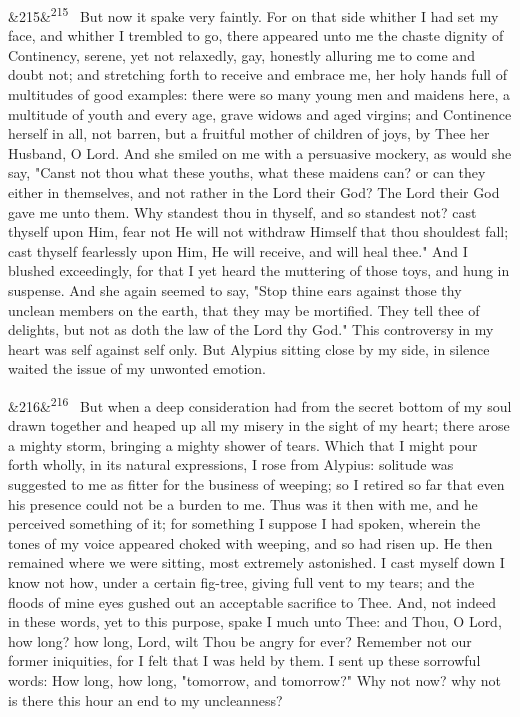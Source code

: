 \documentclass[12pt]{article}
\newcommand{\para}[1][]{\par\noindent\ifx&#1&\else\textsuperscript{\footnotesize #1}~\fi}
\begin{document}
\para[215] But now it spake very faintly. For on that side whither I had set my face, and whither I trembled to go, there appeared unto me the chaste dignity of Continency, serene, yet not relaxedly, gay, honestly alluring me to come and doubt not; and stretching forth to receive and embrace me, her holy hands full of multitudes of good examples: there were so many young men and maidens here, a multitude of youth and every age, grave widows and aged virgins; and Continence herself in all, not barren, but a fruitful mother of children of joys, by Thee her Husband, O Lord. And she smiled on me with a persuasive mockery, as would she say, "Canst not thou what these youths, what these maidens can? or can they either in themselves, and not rather in the Lord their God? The Lord their God gave me unto them. Why standest thou in thyself, and so standest not? cast thyself upon Him, fear not He will not withdraw Himself that thou shouldest fall; cast thyself fearlessly upon Him, He will receive, and will heal thee." And I blushed exceedingly, for that I yet heard the muttering of those toys, and hung in suspense. And she again seemed to say, "Stop thine ears against those thy unclean members on the earth, that they may be mortified. They tell thee of delights, but not as doth the law of the Lord thy God." This controversy in my heart was self against self only. But Alypius sitting close by my side, in silence waited the issue of my unwonted emotion.

\para[216] But when a deep consideration had from the secret bottom of my soul drawn together and heaped up all my misery in the sight of my heart; there arose a mighty storm, bringing a mighty shower of tears. Which that I might pour forth wholly, in its natural expressions, I rose from Alypius: solitude was suggested to me as fitter for the business of weeping; so I retired so far that even his presence could not be a burden to me. Thus was it then with me, and he perceived something of it; for something I suppose I had spoken, wherein the tones of my voice appeared choked with weeping, and so had risen up. He then remained where we were sitting, most extremely astonished. I cast myself down I know not how, under a certain fig-tree, giving full vent to my tears; and the floods of mine eyes gushed out an acceptable sacrifice to Thee. And, not indeed in these words, yet to this purpose, spake I much unto Thee: and Thou, O Lord, how long? how long, Lord, wilt Thou be angry for ever? Remember not our former iniquities, for I felt that I was held by them. I sent up these sorrowful words: How long, how long, "tomorrow, and tomorrow?" Why not now? why not is there this hour an end to my uncleanness?
\end{document}
